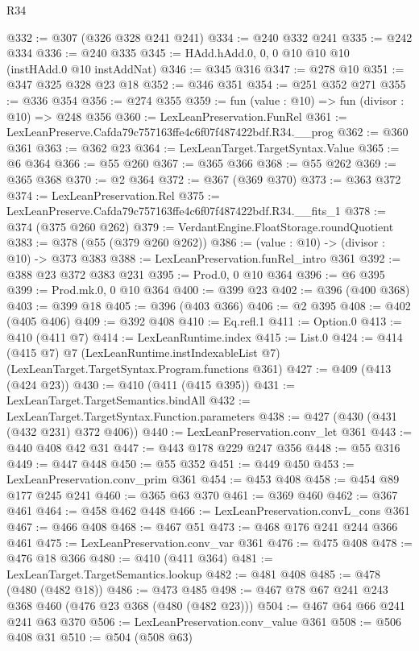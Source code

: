 \begin{lexlean}{R34}
\begin{coremodule}
@332 := @307 (@326 @328 @241 @241)
@334 := @240 @332 @241
@335 := @242 @334
@336 := @240 @335
@345 := HAdd.hAdd.{0, 0, 0} @10 @10 @10 (instHAdd.{0} @10 instAddNat)
@346 := @345 @316
@347 := @278 @10
@351 := @347 @325 @328 @23 @18
@352 := @346 @351
@354 := @251 @352 @271
@355 := @336 @354
@356 := @274 @355
@359 := fun (value : @10) => fun (divisor : @10) => @248 @356
@360 := LexLeanPreservation.FunRel
@361 := LexLeanPreserve.Cafda79c757163ffe4c6f07f487422bdf.R34.__prog
@362 := @360 @361
@363 := @362 @23
@364 := LexLeanTarget.TargetSyntax.Value
@365 := @6 @364
@366 := @55 @260
@367 := @365 @366
@368 := @55 @262
@369 := @365 @368
@370 := @2 @364
@372 := @367 (@369 @370)
@373 := @363 @372
@374 := LexLeanPreservation.Rel
@375 := LexLeanPreserve.Cafda79c757163ffe4c6f07f487422bdf.R34.__fits_1
@378 := @374 (@375 @260 @262)
@379 := VerdantEngine.FloatStorage.roundQuotient
@383 := @378 (@55 (@379 @260 @262))
@386 := (value : @10) -> (divisor : @10) -> @373 @383
@388 := LexLeanPreservation.funRel_intro @361
@392 := @388 @23 @372 @383 @231
@395 := Prod.{0, 0} @10 @364
@396 := @6 @395
@399 := Prod.mk.{0, 0} @10 @364
@400 := @399 @23
@402 := @396 (@400 @368)
@403 := @399 @18
@405 := @396 (@403 @366)
@406 := @2 @395
@408 := @402 (@405 @406)
@409 := @392 @408
@410 := Eq.refl.{1}
@411 := Option.{0}
@413 := @410 (@411 @7)
@414 := LexLeanRuntime.index
@415 := List.{0}
@424 := @414
    (@415 @7)
    @7
    (LexLeanRuntime.instIndexableList @7)
    (LexLeanTarget.TargetSyntax.Program.functions @361)
@427 := @409 (@413 (@424 @23))
@430 := @410 (@411 (@415 @395))
@431 := LexLeanTarget.TargetSemantics.bindAll
@432 := LexLeanTarget.TargetSyntax.Function.parameters
@438 := @427 (@430 (@431 (@432 @231) @372 @406))
@440 := LexLeanPreservation.conv_let @361
@443 := @440 @408 @42 @31
@447 := @443 @178 @229 @247 @356
@448 := @55 @316
@449 := @447 @448
@450 := @55 @352
@451 := @449 @450
@453 := LexLeanPreservation.conv_prim @361
@454 := @453 @408
@458 := @454 @89 @177 @245 @241
@460 := @365 @63 @370
@461 := @369 @460
@462 := @367 @461
@464 := @458 @462 @448
@466 := LexLeanPreservation.convL_cons @361
@467 := @466 @408
@468 := @467 @51
@473 := @468 @176 @241 @244 @366 @461
@475 := LexLeanPreservation.conv_var @361
@476 := @475 @408
@478 := @476 @18 @366
@480 := @410 (@411 @364)
@481 := LexLeanTarget.TargetSemantics.lookup
@482 := @481 @408
@485 := @478 (@480 (@482 @18))
@486 := @473 @485
@498 := @467 @78 @67 @241 @243 @368 @460 (@476 @23 @368 (@480 (@482 @23)))
@504 := @467 @64 @66 @241 @241 @63 @370
@506 := LexLeanPreservation.conv_value @361
@508 := @506 @408 @31
@510 := @504 (@508 @63)

\end{coremodule}
\end{lexlean}
